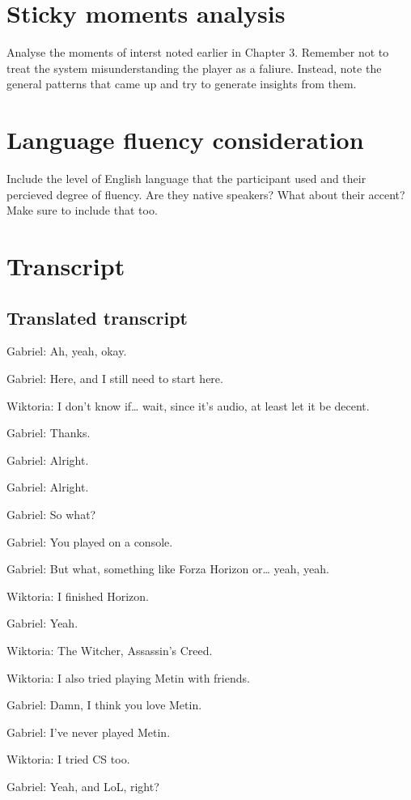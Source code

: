 \section{Sticky moments analysis}

Analyse the moments of interst noted earlier in Chapter 3. Remember not to treat the system misunderstanding the player as a faliure.
Instead, note the general patterns that came up and try to generate insights from them.

\section{Language fluency consideration}

Include the level of English language that the participant used and their percieved degree of fluency.
Are they native speakers? What about their accent? Make sure to include that too.


\section{Transcript}

\subsection{Translated transcript}
Gabriel: Ah, yeah, okay.

Gabriel: Here, and I still need to start here.

Wiktoria: I don’t know if… wait, since it’s audio, at least let it be decent.

Gabriel: Thanks.

Gabriel: Alright.

Gabriel: Alright.

Gabriel: So what?

Gabriel: You played on a console.

Gabriel: But what, something like Forza Horizon or… yeah, yeah.

Wiktoria: I finished Horizon.

Gabriel: Yeah.

Wiktoria: The Witcher, Assassin’s Creed.

Wiktoria: I also tried playing Metin with friends.

Gabriel: Damn, I think you love Metin.

Gabriel: I’ve never played Metin.

Wiktoria: I tried CS too.

Gabriel: Yeah, and LoL, right?

